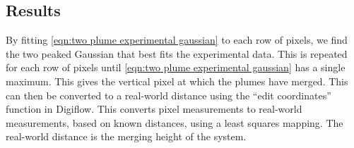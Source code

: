 \documentclass{jfm}
\begin{document}
	\subsection{Results}
	By fitting \eqref{eqn:two plume experimental gaussian} to each row of pixels, we find the two peaked Gaussian that best fits the experimental data. This is repeated for each row of pixels until \eqref{eqn:two plume experimental gaussian} has a single maximum. This gives the vertical pixel at which the plumes have merged. This can then be converted to a real-world distance using the ``edit coordinates'' function in Digiflow. This converts pixel measurements to real-world measurements, based on known distances, using a least squares mapping. The real-world distance is the merging height of the system. \\
	
\end{document}
